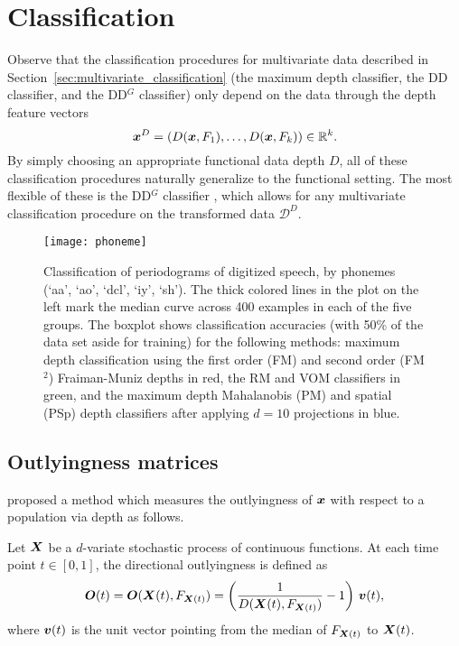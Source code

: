 \section{Classification}

Observe that the classification procedures for multivariate data described in
Section~\ref{sec:multivariate_classification} (the maximum depth classifier,
the DD classifier, and the DD$^G$ classifier) only depend on the data through
the depth feature vectors
\begin{equation}
    \bm{x}^D = (D(\bm{x}, F_1), \dots, D(\bm{x}, F_k)) \in \mathbb{R}^k.
\end{equation}
By simply choosing an appropriate functional data depth $D$, all of these
classification procedures naturally generalize to the functional setting.
The most flexible of these is the DD$^G$ classifier
\parencite{albertos-bande-fuente-2017}, which allows for any multivariate
classification procedure on the transformed data $\mathscr{D}^D$.



\begin{figure}
    \centering
    \texttt{[image: phoneme]}
    \caption{
        Classification of periodograms of digitized
        speech\protect\footnotemark, by
        phonemes (`aa', `ao', `dcl', `iy', `sh').
        The thick colored lines in the plot on the left mark the median curve
        across 400 examples in each of the five groups.
        The boxplot shows classification accuracies (with 50\% of the data set
        aside for training) for the following methods: maximum depth
        classification using the first order (FM) and second order (FM$^2$)
        Fraiman-Muniz depths in red, the RM and VOM classifiers in green, and
        the maximum depth Mahalanobis (PM) and spatial (PSp) depth classifiers
        after applying $d = 10$ projections in blue.
    }
    \label{fig:phoneme_classification}
\end{figure}



\subsection{Outlyingness matrices}

\textcite{dai-genton-2018} proposed a method which measures the outlyingness
of $\bm{x}$ with respect to a population via depth as follows.

\begin{definition}
    Let $\bm{X}$ be a $d$-variate stochastic process of continuous functions.
    At each time point $t \in [0, 1]$, the directional outlyingness is defined
    as
    \begin{equation}
        \bm{O}(t) = \bm{O}(\bm{X}(t), F_{\bm{X}(t)}) = \left(\frac{1}{D(\bm{X}(t), F_{\bm{X}(t)})} - 1\right)\, \bm{v}(t),
    \end{equation}
    where $\bm{v}(t)$ is the unit vector pointing from the median of $F_{\bm{X}(t)}$
    to $\bm{X}(t)$.
\end{definition}

